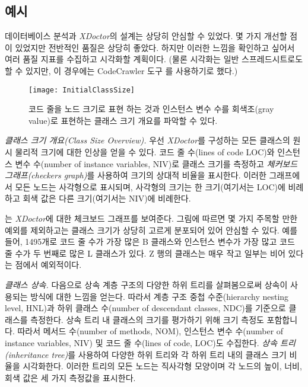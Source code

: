 \documentclass[a4paper,10pt,twoside]{book}
\begin{document}
\subsection*{예시}

데이터베이스 분석과 \emph{XDoctor}의 설계는 상당히 안심할 수 있었다. 몇 가지 개선할 점이 있었지만 전반적인 품질은 상당히 좋았다. 하지만 이러한 느낌을 확인하고 싶어서 여러 품질 지표를 수집하고 시각화할 계획이다. (물론 시각화는 일반 스프레드시트로도 할 수 있지만, 이 경우에는 CodeCrawler 도구 \cite{Deme99c} \cite{Lanz99a}를 사용하기로 했다.)

\begin{figure}
\begin{center}
\texttt{[image: InitialClassSize]}
\caption{코드 줄을 노드 크기로 표현 하는 것과 인스턴스 변수 수를 회색조(gray value)로 표현하는 클래스 크기 개요를 파악할 수 있다.}
\end{center}
\end{figure}

\noindent
\emph{클래스 크기 개요(Class Size Overview).}
우선 \emph{XDoctor}를 구성하는 모든 클래스의 원시 물리적 크기에 대한 인상을 얻을 수 있다. 코드 줄 수(lines of code LOC)와 인스턴스 변수 수(number of instance variables, NIV)로 클래스 크기를 측정하고 \emph{체커보드 그래프(checkers graph)}를 사용하여 크기의 상대적 비율을 표시한다. 이러한 그래프에서 모든 노드는 사각형으로 표시되며, 사각형의 크기는 한 크기(여기서는 LOC)에 비례하고 회색 값은 다른 크기(여기서는 NIV)에 비례한다.

는 \emph{XDoctor}에 대한 체크보드 그래프를 보여준다. 그림에 따르면 몇 가지 주목할 만한 예외를 제외하고는 클래스 크기가 상당히 고르게 분포되어 있어 안심할 수 있다. 예를 들어, 1495개로 코드 줄 수가 가장 많은 B 클래스와 인스턴스 변수가 가장 많고 코드 줄 수가 두 번째로 많은 L 클래스가 있다. Z 행의 클래스는 매우 작고 일부는 비어 있다는 점에서 예외적이다.

\noindent
\emph{클래스 상속.}
다음으로 상속 계층 구조의 다양한 하위 트리를 살펴봄으로써 상속이 사용되는 방식에 대한 느낌을 얻는다. 따라서 계층 구조 중첩 수준(hierarchy nesting level, HNL)과 하위 클래스 수(number of descendant classes, NDC)를 기준으로 클래스를 측정한다. 상속 트리 내 클래스의 크기를 평가하기 위해 크기 측정도 포함합니다. 따라서 메서드 수(number of methods, NOM), 인스턴스 변수 수(number of instance variables, NIV) 및 코드 줄 수(lines of code, LOC)도 수집한다. \emph{상속 트리(inheritance tree)}를 사용하여 다양한 하위 트리와 각 하위 트리 내의 클래스 크기 비율을 시각화한다. 이러한 트리의 모든 노드는 직사각형 모양이며 각 노드의 높이, 너비, 회색 값은 세 가지 측정값을 표시한다.
\end{document}
